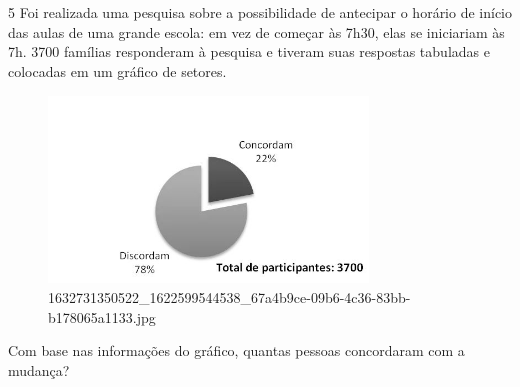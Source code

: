 \begin{escolha}
\begin{boxmedio}
\begin{boxmedio}
{\begin{boxpeq}
\begin{boxpeq}
{\begin{boxpeq}
\begin{boxmedio}
\begin{boxmedio}
\begin{boxpeq}
\begin{boxmedio}
\begin{boxpeq}
\begin{boxpeq}
\begin{boxpeq}
\begin{boxpeq}
\begin{boxmedio}
{\begin{boxmedio}
\begin{boxmedio}
\begin{boxpeq}
\begin{boxmedio}
\begin{boxpeq}
\begin{boxpeq}
\begin{boxpeq}
\begin{escolha}
{\begin{boxmedio}
\begin{boxpeq}
\begin{boxpeq}
\begin{boxpeq}
\begin{boxpeq}
\begin{boxpeq}
\begin{boxmedio}
\begin{boxpeq}
\begin{boxpeq}
\begin{boxpeq}
{\begin{boxpeq}
\begin{boxmedio}
\begin{boxpeq}
\begin{boxpeq}
\begin{boxpeq}
{\begin{boxpeq}
\begin{boxmedio}
{\begin{boxpeq}
\begin{boxpeq}
\begin{boxmedio}
\begin{boxmedio}
\begin{boxpeq}
\begin{boxpeq}
{\begin{boxpeq}
\begin{boxpeq}
\begin{boxpeq}
\begin{boxpeq}
\begin{boxpeq}
\begin{escolha}
\begin{escolha}
{\begin{boxmedio}
\begin{boxpeq}
\begin{q°}
\begin{boxmedio}
\begin{boxpeq}
\begin{boxpeq}
\begin{boxmedio}
\begin{boxmedio}
\begin{boxmedio}
\num{5} Foi realizada uma pesquisa sobre a possibilidade de antecipar o horário
de início das aulas de uma grande escola: em vez de começar às 7h30, elas se iniciariam
às 7h. 3700 famílias responderam à pesquisa e tiveram suas respostas tabuladas e
colocadas em um gráfico de setores.

\begin{figure}
\centering
\includegraphics[width=3.34677in,height=1.96063in]{./_SAEB_9_MAT/media/image215.jpg}
\caption{1632731350522\_1622599544538\_67a4b9ce-09b6-4c36-83bb-b178065a1133.jpg}
\end{figure}


Com base nas informações do gráfico, quantas pessoas concordaram com a mudança?



\end{boxmedio}
\end{boxmedio}
\end{boxmedio}
\end{boxpeq}
\end{boxpeq}
\end{boxmedio}
\end{q°}
\end{boxpeq}
\end{boxmedio}}
\end{escolha}
\end{escolha}
\end{boxpeq}
\end{boxpeq}
\end{boxpeq}
\end{boxpeq}
\end{boxpeq}}
\end{boxpeq}
\end{boxpeq}
\end{boxmedio}
\end{boxmedio}
\end{boxpeq}
\end{boxpeq}}
\end{boxmedio}
\end{boxpeq}}
\end{boxpeq}
\end{boxpeq}
\end{boxpeq}
\end{boxmedio}
\end{boxpeq}}
\end{boxpeq}
\end{boxpeq}
\end{boxpeq}
\end{boxmedio}
\end{boxpeq}
\end{boxpeq}
\end{boxpeq}
\end{boxpeq}
\end{boxpeq}
\end{boxmedio}}
\end{escolha}
\end{boxpeq}
\end{boxpeq}
\end{boxpeq}
\end{boxmedio}
\end{boxpeq}
\end{boxmedio}
\end{boxmedio}}
\end{boxmedio}
\end{boxpeq}
\end{boxpeq}
\end{boxpeq}
\end{boxpeq}
\end{boxmedio}
\end{boxpeq}
\end{boxmedio}
\end{boxmedio}
\end{boxpeq}}
\end{boxpeq}
\end{boxpeq}}
\end{boxmedio}
\end{boxmedio}
\end{escolha}
